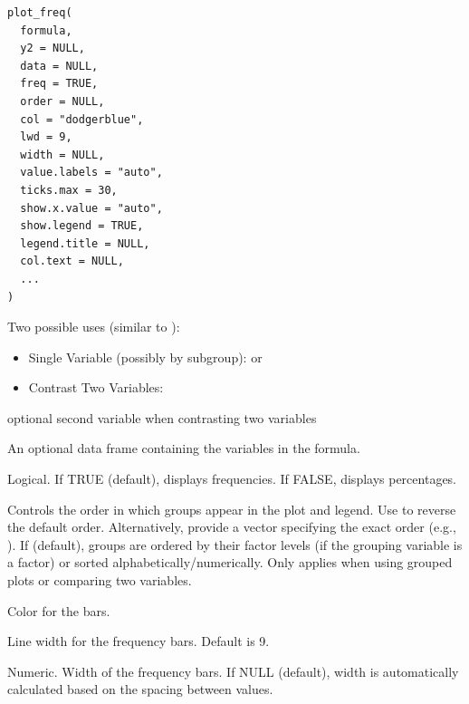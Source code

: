 \documentclass[a4paper]{book}
\begin{document}
%
\begin{Usage}
\begin{verbatim}
plot_freq(
  formula,
  y2 = NULL,
  data = NULL,
  freq = TRUE,
  order = NULL,
  col = "dodgerblue",
  lwd = 9,
  width = NULL,
  value.labels = "auto",
  ticks.max = 30,
  show.x.value = "auto",
  show.legend = TRUE,
  legend.title = NULL,
  col.text = NULL,
  ...
)
\end{verbatim}
\end{Usage}
%
\begin{Arguments}
\begin{ldescription}
\item[\code{formula}] Two possible uses (similar to ):
\begin{itemize}

\item{} Single Variable (possibly by subgroup):  or 
\item{} Contrast Two Variables: 

\end{itemize}


\item[\code{y2}] optional second variable when contrasting two variables 

\item[\code{data}] An optional data frame containing the variables in the formula.

\item[\code{freq}] Logical. If TRUE (default), displays frequencies. If FALSE, displays percentages.

\item[\code{order}] Controls the order in which groups appear in the plot and legend. 
Use  to reverse the default order. Alternatively, provide a vector specifying
the exact order (e.g., ). If  (default), groups are 
ordered by their factor levels (if the grouping variable is a factor) or sorted 
alphabetically/numerically. Only applies when using grouped plots or comparing two variables.

\item[\code{col}] Color for the bars.

\item[\code{lwd}] Line width for the frequency bars. Default is 9.

\item[\code{width}] Numeric. Width of the frequency bars. If NULL (default), width is automatically calculated based on the spacing between values.


\end{ldescription}
\end{Arguments}
\end{document}
